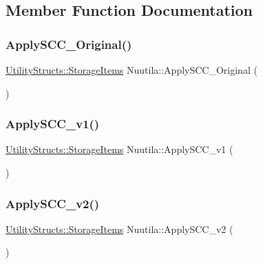 \subsection{Member Function Documentation}
\mbox{\label{class_nuutila_a7d52f96cf25409704bfd7bf176fcc7c5}} 
\subsubsection{\texorpdfstring{Apply\+S\+C\+C\+\_\+\+Original()}{ApplySCC\_Original()}}
{\footnotesize\ttfamily \hyperlink{struct_utility_structs_1_1_storage_items}{Utility\+Structs\+::\+Storage\+Items} Nuutila\+::\+Apply\+S\+C\+C\+\_\+\+Original (\begin{DoxyParamCaption}{ }\end{DoxyParamCaption})}

\mbox{\label{class_nuutila_a6c355594f68dad8c28684114a6df6700}} 
\subsubsection{\texorpdfstring{Apply\+S\+C\+C\+\_\+v1()}{ApplySCC\_v1()}}
{\footnotesize\ttfamily \hyperlink{struct_utility_structs_1_1_storage_items}{Utility\+Structs\+::\+Storage\+Items} Nuutila\+::\+Apply\+S\+C\+C\+\_\+v1 (\begin{DoxyParamCaption}{ }\end{DoxyParamCaption})}

\mbox{\label{class_nuutila_a291d578f760e0f11a5c56c8a5fe02ebd}} 
\subsubsection{\texorpdfstring{Apply\+S\+C\+C\+\_\+v2()}{ApplySCC\_v2()}}
{\footnotesize\ttfamily \hyperlink{struct_utility_structs_1_1_storage_items}{Utility\+Structs\+::\+Storage\+Items} Nuutila\+::\+Apply\+S\+C\+C\+\_\+v2 (\begin{DoxyParamCaption}{ }\end{DoxyParamCaption})}

